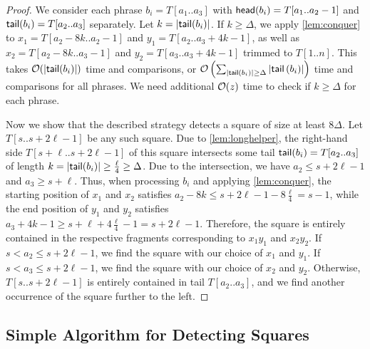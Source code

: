 \begin{proof}
\newcommand{\targettime}{\Sigma_{\textsf{target}}}
We consider each phrase $b_i = T[a_1..a_3]$ with $\textsf{head}(b_i) = T[a_1..a_2 - 1]$ and $\textsf{tail}(b_i) = T[a_2..a_3]$ separately. Let $k = \left\lvert\textsf{tail}(b_i)\right\rvert$. 
If $k \geq \Delta$, we apply \cref{lem:conquer} to $x_1 = T[a_2 - 8k..a_2 - 1]$ and $y_1 = T[a_2..a_3 + 4k - 1]$, as well as $x_2 = T[a_2 - 8k..a_3 - 1]$ and $y_2 = T[a_3..a_3 + 4k - 1]$ trimmed to $T[1..n]$. This takes $\mathcal{O}(\left\lvert\textsf{tail}(b_i)\right\rvert)$ time and comparisons, or $\mathcal{O}\left(\sum_{\left\lvert\textsf{tail}\left(b_{i}\right)\right\rvert \geq \Delta}\left\lvert\textsf{tail}\left(b_{i}\right)\right\rvert\right)$ time and comparisons for all phrases. We need additional $\mathcal{O}(z)$ time to check if $k \geq \Delta$ for each phrase.

Now we show that the described strategy detects a square of size at least $8\Delta$. Let $T[s..s+2\ell - 1]$ be any such square.
Due to \cref{lem:longhelper}, the right-hand side $T[s+\ell..s+2\ell - 1]$ of this square intersects some tail $\textsf{tail}(b_i) = T[a_2..a_3]$ of length $k = \left\lvert\textsf{tail}(b_i)\right\rvert \geq \frac \ell 4 \geq \Delta$.
Due to the intersection, we have $a_2 \leq s +2\ell - 1$ and $a_3 \geq s + \ell$.
Thus, when processing $b_i$ and applying \cref{lem:conquer}, the starting position of $x_1$ and $x_2$ satisfies $a_2 - 8k \leq s +2\ell - 1 - 8\frac \ell 4 = s - 1$, while the end position of $y_1$ and $y_2$ satisfies $a_3 + 4k - 1 \geq s + \ell + 4\frac \ell 4 - 1 = s + 2\ell - 1$. 
Therefore, the square is entirely contained in the respective fragments corresponding to $x_1y_1$ and $x_2y_2$.
If $s < a_2 \leq s + 2\ell - 1$, we find the square with our choice of $x_1$ and $y_1$.
If $s < a_3 \leq s + 2\ell - 1$, we find the square with our choice of $x_2$ and $y_2$.
Otherwise, $T[s..s + 2\ell - 1]$ is entirely contained in tail $T[a_2..a_3]$, and we find another occurrence of the square further to the left.
\end{proof}

\subsection{Simple Algorithm for Detecting Squares}

